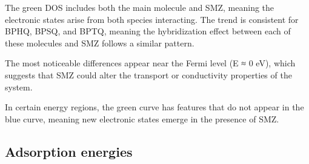 \documentclass[preprint,12pt]{elsarticle}
\begin{document}
	The green DOS includes both the main molecule and SMZ, meaning the electronic states arise from both species interacting. The trend is consistent for BPHQ, BPSQ, and BPTQ, meaning the hybridization effect between each of these molecules and SMZ follows a similar pattern.
	
	The most noticeable differences appear near the Fermi level (E ≈ 0 eV), which suggests that SMZ could alter the transport or conductivity properties of the system.
	
	In certain energy regions, the green curve has features that do not appear in the blue curve, meaning new electronic states emerge in the presence of SMZ.
	
	
	\subsection{Adsorption energies}
	
\end{document}
